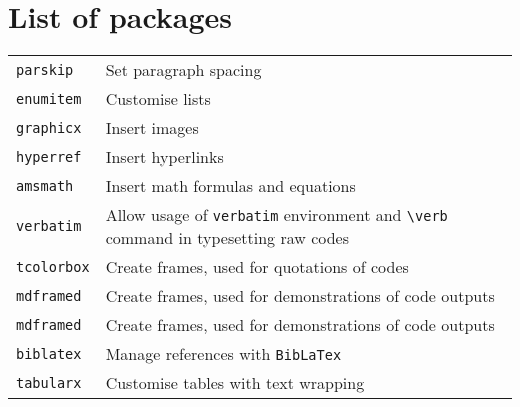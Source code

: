 \section{List of packages}

\begin{center}

\begin{tabularx}{\linewidth}{ l | X }
    \verb|parskip| & Set paragraph spacing \\
    \verb|enumitem| & Customise lists \\
    \verb|graphicx| & Insert images \\
    \verb|hyperref| & Insert hyperlinks \\
    \verb|amsmath| & Insert math formulas and equations \\
    \verb|verbatim| & Allow usage of \verb|verbatim| environment and \verb|\verb| command in typesetting raw codes \\
    \verb|tcolorbox| & Create frames, used for quotations of codes \\
    \verb|mdframed| & Create frames, used for demonstrations of code outputs \\
    \verb|mdframed| & Create frames, used for demonstrations of code outputs \\
    \verb|biblatex| & Manage references with \verb|BibLaTex| \\ 
    \verb|tabularx| & Customise tables with text wrapping
\end{tabularx}

\end{center}